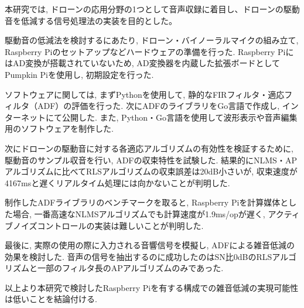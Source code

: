 \begin{jabstract}
本研究では, ドローンの応用分野の1つとして音声収録に着目し、ドローンの駆動音を低減する信号処理法の実装を目的とした。

駆動音の低減法を検討するにあたり, ドローン・バイノーラルマイクの組み立て, Raspberry
Piのセットアップなどハードウェアの準備を行った.  Raspberry
PiにはAD変換が搭載されていないため, AD変換器を内蔵した拡張ボードとしてPumpkin Piを使用し, 初期設定を行った. 

ソフトウェアに関しては, まずPythonを使用して, 静的なFIRフィルタ・適応フィルタ（ADF）の評価を行った. 次にADFのライブラリをGo言語で作成し, インターネットにて公開した. また, Python・Go言語を使用して波形表示や音声編集用のソフトウェアを制作した. 

次にドローンの駆動音に対する各適応アルゴリズムの有効性を検証するために, 駆動音のサンプル収音を行い, ADFの収束特性を試験した. 結果的にNLMS・APアルゴリズムに比べてRLSアルゴリズムの収束誤差は20dB小さいが, 収束速度が4167msと遅くリアルタイム処理には向かないことが判明した. 

制作したADFライブラリのベンチマークを取ると, Raspberry Piを計算媒体とした場合, 一番高速なNLMSアルゴリズムでも計算速度が1.9ms/opが遅く, アクティブノイズコントロールの実装は難しいことが判明した. 

最後に, 実際の使用の際に入力される音響信号を模擬し, ADFによる雑音低減の効果を検討した. 音声の信号を抽出するのに成功したのはSN比0dBのRLSアルゴリズムと一部のフィルタ長のAPアルゴリズムのみであった. 

以上より本研究で検討したRaspberry Piを有する構成での雑音低減の実現可能性は低いことを結論付ける. 
\end{jabstract}

